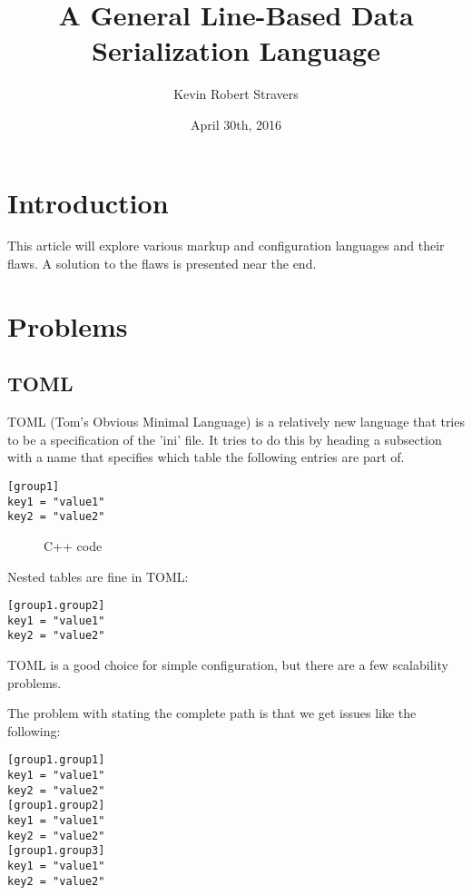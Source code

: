 \documentclass[listof=totoc]{article}
\title{A General Line-Based Data Serialization Language}
\author{Kevin Robert Stravers}
\date{April 30th, 2016}
\begin{document}
\maketitle

\iffalse
  \tableofcontents
  \lstlistoflistings
\fi

\section{Introduction}
\noindent This article will explore various markup and configuration languages and their flaws. A solution to the flaws is presented near the end.

\section{Problems}
\subsection{TOML}
\noindent TOML (Tom's Obvious Minimal Language) is a relatively new language that tries to be a specification of the 'ini' file.
It tries to do this by heading a subsection with a name that specifies which table the following entries are part of.

\begin{verbatim}
[group1]
key1 = "value1"
key2 = "value2"
\end{verbatim}

\begin{figure}[!htb]
\centering
\begin{varwidth}{\linewidth}
\end{varwidth}
\caption{C++ code}
\end{figure}

\noindent Nested tables are fine in TOML:

\begin{verbatim}
[group1.group2]
key1 = "value1"
key2 = "value2"
\end{verbatim}

\noindent TOML is a good choice for simple configuration, but there are a few scalability problems.


\noindent The problem with stating the complete path is that we get issues like the following:

\begin{verbatim}
[group1.group1]
key1 = "value1"
key2 = "value2"
[group1.group2]
key1 = "value1"
key2 = "value2"
[group1.group3]
key1 = "value1"
key2 = "value2"
\end{verbatim}
\end{document}
